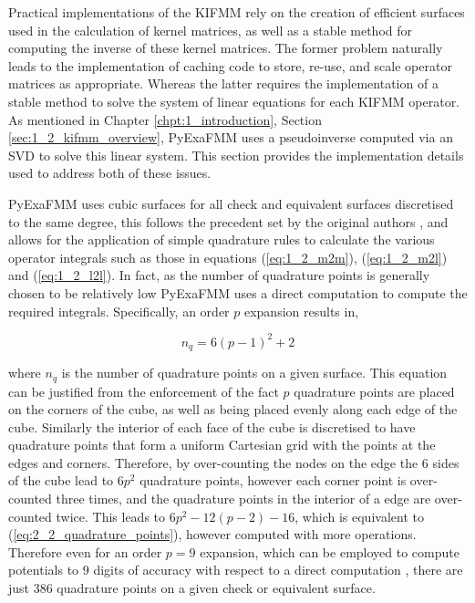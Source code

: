 Practical implementations of the \gls{KIFMM} rely on the creation of efficient
surfaces used in the calculation of kernel matrices, as well as a stable method for
computing the inverse of these kernel matrices. The former problem naturally leads
to the implementation of caching code to store, re-use, and scale operator matrices
as appropriate. Whereas the latter requires the implementation of a stable method to
solve the system of linear equations for each \gls{KIFMM} operator. As mentioned
in Chapter \ref{chpt:1_introduction}, Section \ref{sec:1_2_kifmm_overview}, \gls{PyExaFMM} uses
a pseudoinverse computed via an SVD to solve this linear system. This section
provides the implementation details used to address both of these issues.

\gls{PyExaFMM} uses cubic surfaces for all check and equivalent surfaces discretised
to the same degree, this follows the precedent set by the original authors \cite{Ying:2004:JCP}, and
allows for the application of simple quadrature rules to calculate the various
operator integrals such as those in equations (\ref{eq:1_2_m2m}), (\ref{eq:1_2_m2l})
and (\ref{eq:1_2_l2l}). In fact, as the number of quadrature points is generally
chosen to be relatively low \gls{PyExaFMM} uses a direct computation to
compute the required integrals. Specifically, an order $p$ expansion results in,

\begin{equation}
    n_q =  6(p-1)^2 + 2
    \label{eq:2_2_quadrature_points}
\end{equation}

where $n_q$ is the number of quadrature points on a given surface. This equation can be
justified from the enforcement of the fact $p$ quadrature points are placed on the corners
of the cube, as well as being placed evenly along each edge of the cube. Similarly the
interior of each face of the cube is discretised to have quadrature points that form
a uniform Cartesian grid with the points at the edges and corners. Therefore,
by over-counting the nodes on the edge the 6 sides of the cube lead to $6p^2$ quadrature
points, however each corner point is over-counted three times, and the quadrature points
in the interior of a edge are over-counted twice. This leads to $6p^2 - 12(p-2) - 16$,
which is equivalent to (\ref{eq:2_2_quadrature_points}), however computed with more operations.
Therefore even for an order $p=9$ expansion, which can be employed to compute
potentials to 9 digits of accuracy with respect to a direct computation
\cite{Malhotra:2015:CCP}, there are just 386 quadrature points on a given check
or equivalent surface.

